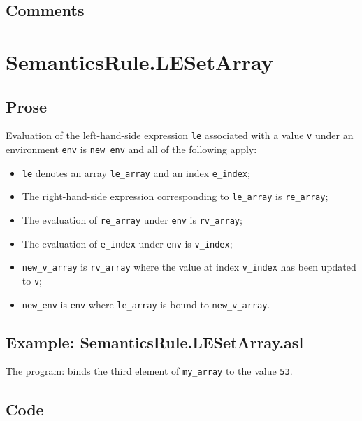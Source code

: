 \documentclass{book}
\begin{document}
   \subsection{Comments}

\section{SemanticsRule.LESetArray \label{sec:SemanticsRule.LESetArray}}

    \subsection{Prose}
    Evaluation of the left-hand-side expression \texttt{le} associated with a
value \texttt{v} under an environment \texttt{env} is \texttt{new\_env} and all
of the following apply:
    \begin{itemize}
    \item \texttt{le} denotes an array \texttt{le\_array} and an index \texttt{e\_index};
    \item The right-hand-side expression corresponding to \texttt{le\_array} is \texttt{re\_array};
    \item The evaluation of \texttt{re\_array} under \texttt{env} is \texttt{rv\_array};
    \item The evaluation of \texttt{e\_index} under \texttt{env} is \texttt{v\_index};
    \item \texttt{new\_v\_array} is \texttt{rv\_array} where the value at index \texttt{v\_index} has been
      updated to \texttt{v};
    \item \texttt{new\_env} is \texttt{env} where \texttt{le\_array} is bound to
      \texttt{new\_v\_array}.
    \end{itemize}

    \subsection{Example: SemanticsRule.LESetArray.asl}
    The program:
    binds the third element of \texttt{my\_array} to the value \texttt{53}.

  \subsection{Code}
\end{document}
